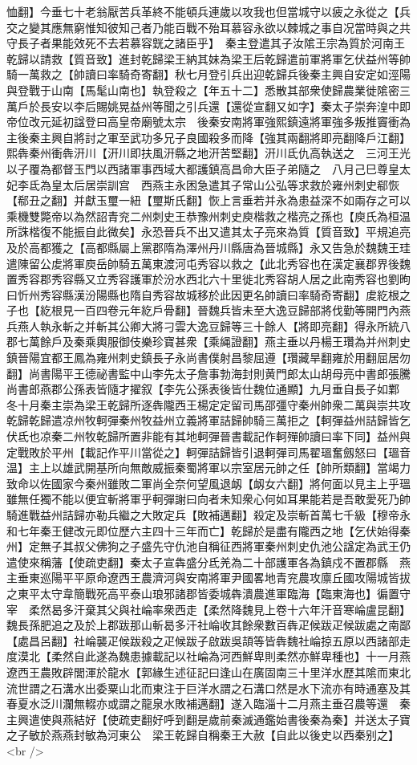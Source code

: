 恤翻】今垂七十老翁厭苦兵革終不能頓兵連歲以攻我也但當城守以疲之永從之【兵交之變其應無窮惟知彼知己者乃能百戰不殆耳慕容永欲以棘城之事自况當時與之共守長子者果能效死不去若慕容皝之諸臣乎】　秦主登遣其子汝隂王宗為質於河南王乾歸以請救【質音致】進封乾歸梁王納其妹為梁王后乾歸遣前軍將軍乞伏益州等帥騎一萬救之【帥讀曰率騎奇寄翻】秋七月登引兵出迎乾歸兵後秦主興自安定如涇陽與登戰于山南【馬髦山南也】執登殺之【年五十二】悉散其部衆使歸農業徙隂密三萬戶於長安以李后賜姚晃益州等聞之引兵還【還從宣翻又如字】秦太子崇奔湟中即帝位改元延初諡登曰高皇帝廟號太宗　後秦安南將軍強熙鎮遠將軍強多叛推竇衝為主後秦主興自將討之軍至武功多兄子良國殺多而降【強其兩翻將即亮翻降戶江翻】熙犇秦州衝犇汧川【汧川即扶風汧縣之地汧苦堅翻】汧川氐仇高執送之　三河王光以子覆為都督玉門以西諸軍事西域大都護鎮高昌命大臣子弟隨之　八月己巳尊皇太妃李氐為皇太后居崇訓宫　西燕主永困急遣其子常山公弘等求救於雍州刺史郗恢【郗丑之翻】并獻玉璽一紐【璽斯氏翻】恢上言垂若并永為患益深不如兩存之可以乘機雙斃帝以為然詔青兖二州刺史王恭豫州刺史庾楷救之楷亮之孫也【庾氏為桓温所誅楷復不能振自此微矣】永恐晉兵不出又遣其太子亮來為質【質音致】平規追亮及於高都獲之【高都縣屬上黨郡隋為澤州丹川縣唐為晉城縣】永又告急於魏魏王珪遣陳留公䖍將軍庾岳帥騎五萬東渡河屯秀容以救之【此北秀容也在漢定襄郡界後魏置秀容郡秀容縣又立秀容護軍於汾水西北六十里徙北秀容胡人居之此南秀容也劉昫曰忻州秀容縣漢汾陽縣也隋自秀容故城移於此因更名帥讀曰率騎奇寄翻】䖍紇根之子也【紇根見一百四卷元年紇戶骨翻】晉魏兵皆未至大逸豆歸部將伐勤等開門內燕兵燕人執永斬之并斬其公卿大將刁雲大逸豆歸等三十餘人【將即亮翻】得永所統八郡七萬餘戶及秦乘輿服御伎樂珍寶甚衆【乘䋲證翻】燕主垂以丹楊王瓚為并州刺史鎮晉陽宜都王鳳為雍州刺史鎮長子永尚書僕射昌黎屈遵【瓚藏旱翻雍於用翻屈居勿翻】尚書陽平王德祕書監中山李先太子詹事勃海封則黄門郎太山胡母亮中書郎張騰尚書郎燕郡公孫表皆隨才擢叙【李先公孫表後皆仕魏位通顯】九月垂自長子如鄴　冬十月秦主崇為梁王乾歸所逐犇隴西王楊定定留司馬邵彊守秦州帥衆二萬與崇共攻乾歸乾歸遣凉州牧軻彈秦州牧益州立義將軍詰歸帥騎三萬拒之【軻彈益州詰歸皆乞伏氐也凉秦二州牧乾歸所置非能有其地軻彈晉書載記作軻殫帥讀曰率下同】益州與定戰敗於平州【載記作平川當從之】軻彈詰歸皆引退軻彈司馬翟瑥奮劔怒曰【瑥音温】主上以雄武開基所向無敵威振秦蜀將軍以宗室居元帥之任【帥所類翻】當竭力致命以佐國家今秦州雖敗二軍尚全奈何望風退衂【衂女六翻】將何面以見主上乎瑥雖無任獨不能以便宜斬將軍乎軻彈謝曰向者未知衆心何如耳果能若是吾敢愛死乃帥騎進戰益州詰歸亦勒兵繼之大敗定兵【敗補邁翻】殺定及崇斬首萬七千級【穆帝永和七年秦王健改元即位歷六主四十三年而亡】乾歸於是盡有隴西之地【乞伏始得秦州】定無子其叔父佛狗之子盛先守仇池自稱征西將軍秦州刺史仇池公諡定為武王仍遣使來稱藩【使疏吏翻】秦太子宣犇盛分氐羌為二十部護軍各為鎮戍不置郡縣　燕主垂東巡陽平平原命遼西王農濟河與安南將軍尹國畧地青兖農攻廪丘國攻陽城皆拔之東平太守韋簡戰死高平泰山琅邪諸郡皆委城犇潰農進軍臨海【臨東海也】徧置守宰　柔然曷多汗棄其父與社崘率衆西走【柔然降魏見上卷十六年汗音寒崘盧昆翻】魏長孫肥追之及於上郡跋那山斬曷多汗社崘收其餘衆數百犇疋候跋疋候跋處之南鄙【處昌呂翻】社崘襲疋候跋殺之疋候跋子啟跋吳頡等皆犇魏社崘掠五原以西諸部走度漠北【柔然自此遂為魏患據載記以社崘為河西鮮卑則柔然亦鮮卑種也】十一月燕遼西王農敗辟閭渾於龍水【郭緣生述征記曰逢山在廣固南三十里洋水歷其隂而東北流世謂之石溝水出委粟山北而東注于巨洋水謂之石溝口然是水下流亦有時通塞及其春夏水泛川瀾無輟亦或謂之龍泉水敗補邁翻】遂入臨淄十二月燕主垂召農等還　秦主興遣使與燕結好【使疏吏翻好呼到翻是歲前秦滅通鑑始書後秦為秦】并送太子寶之子敏於燕燕封敏為河東公　梁王乾歸自稱秦王大赦【自此以後史以西秦别之】<br />

